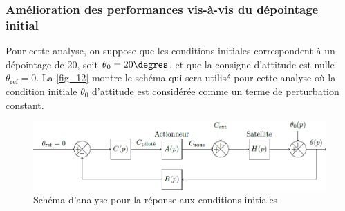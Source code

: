 \fi

\subsubsection{\label{sec:3:D:1} Amélioration des performances vis-à-vis du dépointage initial}

\ifprof
\else

Pour cette analyse, on suppose que les conditions initiales correspondent à un dépointage de 20\degres, soit $\theta_0 = 20\degres$,
et que la consigne d’attitude est nulle $\theta_{\text{ref}}=0$. La \autoref{fig_12} montre le schéma qui sera utilisé pour cette analyse
où la condition initiale $\theta_0$ d’attitude est considérée comme un terme de perturbation constant.

\begin{figure}[H]
\centering
\includegraphics[width=\linewidth]{images/fig_12}
\caption{Schéma d’analyse pour la réponse aux conditions initiales \label{fig_12}}
\end{figure}
\fi


